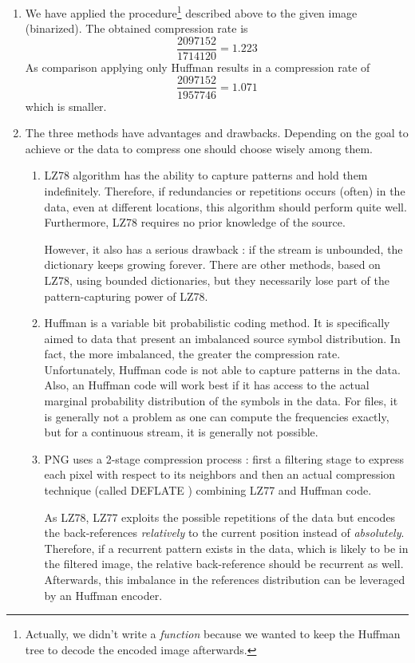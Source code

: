 \documentclass[a4paper, 12pt]{article}
\begin{document}
\begin{enumerate}[leftmargin=*]
        
        \item We have applied the procedure\footnote{Actually, we didn't write a \emph{function} because we wanted to keep the Huffman tree to decode the encoded image afterwards.} described above to the given image (binarized). The obtained compression rate is $$\frac{\num{2097152}}{\num{1714120}} = \num{1.223}$$ As comparison applying only Huffman results in a compression rate of $$\frac{\num{2097152}}{\num{1957746}} = \num{1.071}$$ which is smaller.
        
        
        \item The three methods have advantages and drawbacks. Depending on the goal to achieve or the data to compress one should choose wisely among them.
        \begin{enumerate}[label=(\alph*)]
            \item LZ78 algorithm has the ability to capture patterns and hold them indefinitely. Therefore, if redundancies or repetitions occurs (often) in the data, even at different locations, this algorithm should perform quite well. Furthermore, LZ78 requires no prior knowledge of the source.

            However, it also has a serious drawback : if the stream is unbounded, the dictionary keeps growing forever. There are other methods, based on LZ78, using bounded dictionaries, but they necessarily lose part of the pattern-capturing power of LZ78.
            \item Huffman is a variable bit probabilistic coding method. It is specifically aimed to data that present an imbalanced source symbol distribution. In fact, the more imbalanced, the greater the compression rate.
            Unfortunately, Huffman code is not able to capture patterns in the data. Also, an Huffman code will work best if it has access to the actual marginal probability distribution of the symbols in the data. For files, it is generally not a problem as one can compute the frequencies exactly, but for a continuous stream, it is generally not possible.
            \item PNG uses a 2-stage compression process : first a filtering stage to express each pixel with respect to its neighbors and then an actual compression technique (called DEFLATE \cite{deutsch1996deflate}) combining LZ77 \cite{ziv1977universal} and Huffman code.
            
            As LZ78, LZ77 exploits the possible repetitions of the data but encodes the back-references \emph{relatively} to the current position instead of \emph{absolutely}. Therefore, if a recurrent pattern exists in the data, which is likely to be in the filtered image, the relative back-reference should be recurrent as well. Afterwards, this imbalance in the references distribution can be leveraged by an Huffman encoder.
            

\end{enumerate}
\end{enumerate}
\end{document}
